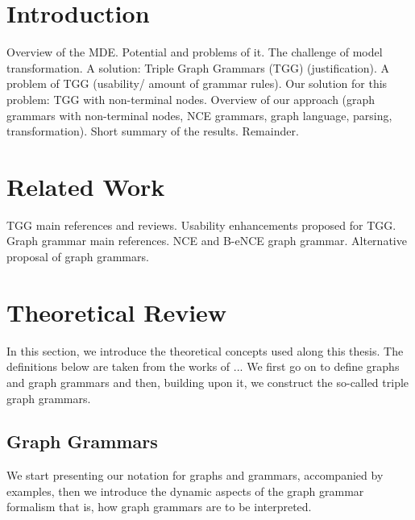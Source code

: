 \documentclass[]{report}
\title{}
\author{William Bombardelli da Silva}
\begin{document}
\maketitle

\begin{abstract}
\end{abstract}

\tableofcontents
\newpage

\section{Introduction}
Overview of the MDE. Potential and problems of it. The challenge of model transformation. A solution: Triple Graph Grammars (TGG) (justification). A problem of TGG (usability/ amount of grammar rules). Our solution for this problem: TGG with non-terminal nodes. Overview of our approach (graph grammars with non-terminal nodes, NCE grammars, graph language, parsing, transformation). Short summary of the results. Remainder.

\section{Related Work}
TGG main references and reviews. Usability enhancements proposed for TGG. Graph grammar main references. NCE and B-eNCE graph grammar. Alternative proposal of graph grammars.

\section{Theoretical Review}
In this section, we introduce the theoretical concepts used along this thesis. The definitions below are taken from the works of ...%
We first go on to define graphs and graph grammars and then, building upon it, we construct the so-called triple graph grammars.

\subsection{Graph Grammars}
We start presenting our notation for graphs and grammars, accompanied by examples, then we introduce the dynamic aspects of the graph grammar formalism that is, how graph grammars are to be interpreted.

\end{document}
